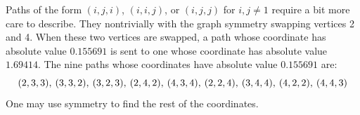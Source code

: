 Paths of the form $(i,j,i)$, $(i,i,j)$, or $(i,j,j)$ for $i,j\neq1$ require a bit more care to describe. They nontrivially with the graph symmetry swapping vertices 2 and 4. When these two vertices are swapped, a path whose coordinate has absolute value $0.155691$ is sent to one whose coordinate has absolute value $1.69414$. The nine paths whose coordinates have absolute value $0.155691$ are:
\[
    (2,3,3),\hspace{0.2em} (3,3,2),\hspace{0.2em} (3,2,3),\hspace{0.2em} (2,4,2),\hspace{0.2em} (4,3,4),\hspace{0.2em} (2,2,4),\hspace{0.2em} (3,4,4),\hspace{0.2em} (4,2,2),\hspace{0.2em} (4,4,3) 
\]
One may use symmetry to find the rest of the coordinates.

